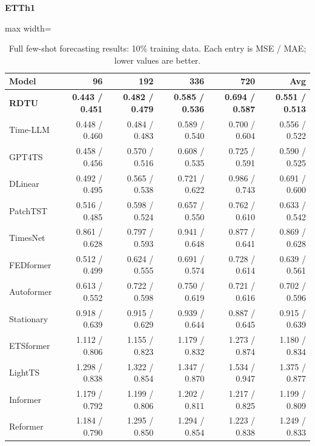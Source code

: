 \begin{table}[H]\centering\small
\caption{Full few-shot forecasting results: 10\% training data. Each entry is MSE / MAE; lower values are better.}\label{tab:few-shot-forecasting-10per-full}
\textbf{ETTh1}\par\smallskip
\begin{adjustbox}{max width=\linewidth}\begin{tabular}{lrrrrr}\toprule
\textbf{Model} & \textbf{96} & \textbf{192} & \textbf{336} & \textbf{720} & \textbf{Avg}\\\midrule
\rowcolor{blue!5}
\textbf{RDTU} & \textbf{0.443 / 0.451} & \textbf{0.482 / 0.479} & \textbf{0.585 / 0.536} & \textbf{0.694 / 0.587} & \textbf{0.551 / 0.513}\\
Time-LLM & 0.448 / 0.460 & 0.484 / 0.483 & 0.589 / 0.540 & 0.700 / 0.604 & 0.556 / 0.522\\
GPT4TS & 0.458 / 0.456 & 0.570 / 0.516 & 0.608 / 0.535 & 0.725 / 0.591 & 0.590 / 0.525\\
DLinear & 0.492 / 0.495 & 0.565 / 0.538 & 0.721 / 0.622 & 0.986 / 0.743 & 0.691 / 0.600\\
PatchTST & 0.516 / 0.485 & 0.598 / 0.524 & 0.657 / 0.550 & 0.762 / 0.610 & 0.633 / 0.542\\
TimesNet & 0.861 / 0.628 & 0.797 / 0.593 & 0.941 / 0.648 & 0.877 / 0.641 & 0.869 / 0.628\\
FEDformer & 0.512 / 0.499 & 0.624 / 0.555 & 0.691 / 0.574 & 0.728 / 0.614 & 0.639 / 0.561\\
Autoformer & 0.613 / 0.552 & 0.722 / 0.598 & 0.750 / 0.619 & 0.721 / 0.616 & 0.702 / 0.596\\
Stationary & 0.918 / 0.639 & 0.915 / 0.629 & 0.939 / 0.644 & 0.887 / 0.645 & 0.915 / 0.639\\
ETSformer & 1.112 / 0.806 & 1.155 / 0.823 & 1.179 / 0.832 & 1.273 / 0.874 & 1.180 / 0.834\\
LightTS & 1.298 / 0.838 & 1.322 / 0.854 & 1.347 / 0.870 & 1.534 / 0.947 & 1.375 / 0.877\\
Informer & 1.179 / 0.792 & 1.199 / 0.806 & 1.202 / 0.811 & 1.217 / 0.825 & 1.199 / 0.809\\
Reformer & 1.184 / 0.790 & 1.295 / 0.850 & 1.294 / 0.854 & 1.223 / 0.838 & 1.249 / 0.833\\
\bottomrule\end{tabular}\end{adjustbox}\end{table}
